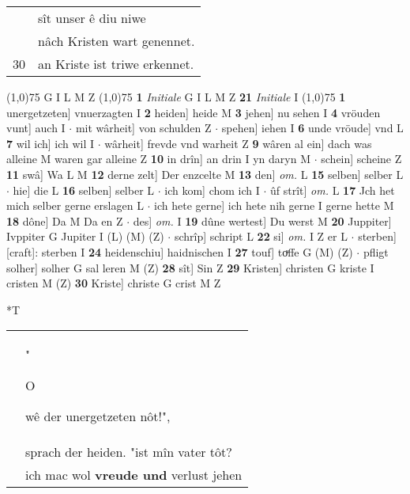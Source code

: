 \documentclass[8pt,a4paper,notitlepage]{article}
\begin{document}
\begin{table}[ht]
\begin{minipage}[t]{0.5\linewidth}
\begin{tabular}{rl}
 & sît unser ê diu niwe\\ 
 & nâch Kristen wart genennet.\\ 
30 & an Kriste ist triwe erkennet.\\ 
\end{tabular}
\scriptsize
\line(1,0){75} \newline
G I L M Z \newline
\line(1,0){75} \newline
\textbf{1} \textit{Initiale} G I L M Z  \textbf{21} \textit{Initiale} I  \newline
\line(1,0){75} \newline
\textbf{1} unergetzeten] vnuerzagten I \textbf{2} heiden] heide M \textbf{3} jehen] nu sehen I \textbf{4} vröuden vunt] auch I  $\cdot$ mit wârheit] von schulden Z  $\cdot$ spehen] iehen I \textbf{6} unde vröude] vnd L \textbf{7} wil ich] ich wil I  $\cdot$ wârheit] frevde vnd warheit Z \textbf{9} wâren al ein] dach was alleine M waren gar alleine Z \textbf{10} in drîn] an drin I yn daryn M  $\cdot$ schein] scheine Z \textbf{11} swâ] Wa L M \textbf{12} derne zelt] Der enzcelte M \textbf{13} den] \textit{om.} L \textbf{15} selben] selber L  $\cdot$ hie] die L \textbf{16} selben] selber L  $\cdot$ ich kom] chom ich I  $\cdot$ ûf strît] \textit{om.} L \textbf{17} Jch het mich selber gerne erslagen L  $\cdot$ ich hete gerne] ich hete nih gerne I gerne hette M \textbf{18} dône] Da M Da en Z  $\cdot$ des] \textit{om.} I \textbf{19} dûne wertest] Du werst M \textbf{20} Juppiter] Ivppiter G Jupiter I (L) (M) (Z)  $\cdot$ schrîp] schript L \textbf{22} si] \textit{om.} I Z er L  $\cdot$ sterben] [craft]: sterben I \textbf{24} heidenschiu] haidnischen I \textbf{27} touf] toͮffe G (M) (Z)  $\cdot$ pfligt solher] solher G sal leren M (Z) \textbf{28} sît] Sin Z \textbf{29} Kristen] christen G kriste I cristen M (Z) \textbf{30} Kriste] christe G crist M Z \newline
\end{minipage}
\hspace{0.5cm}
\begin{minipage}[t]{0.5\linewidth}
\small
\begin{center}*T
\end{center}
\begin{tabular}{rl}
 & "\begin{large}O\end{large}wê der unergetzeten nôt!",\\ 
 & sprach der heiden. "ist mîn vater tôt?\\ 
 & ich mac wol \textbf{vreude und} verlust jehen\\ 

\end{tabular}
\end{minipage}
\end{table}
\end{document}
